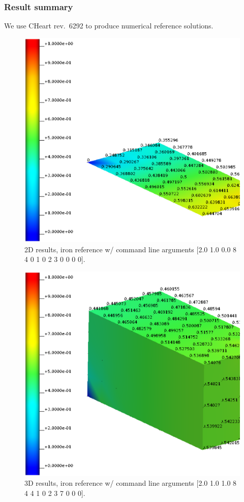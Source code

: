 \subsubsection{Result summary}
%
We use CHeart rev.\ 6292 to produce numerical reference solutions.
%


%
\begin{figure}[h!]
    \centering 
    \includegraphics[width=0.9\columnwidth]{examples/example-0012/doc/figures/iron_reference_2D.eps} 
    \caption{2D results, iron reference w/ command line arguments [2.0 1.0 0.0 8 4 0 1 0 2 3 0 0 0 0].}
    \label{example-0012-iron-2D-reference-fig}
\end{figure}
%
\begin{figure}[h!]
    \centering 
    \includegraphics[width=0.9\columnwidth]{examples/example-0012/doc/figures/iron_reference_3D.eps} 
    \caption{3D results, iron reference w/ command line arguments [2.0 1.0 1.0 8 4 4 1 0 2 3 7 0 0 0].}
    \label{example-0012-iron-3D-reference-fig}
\end{figure}
%
